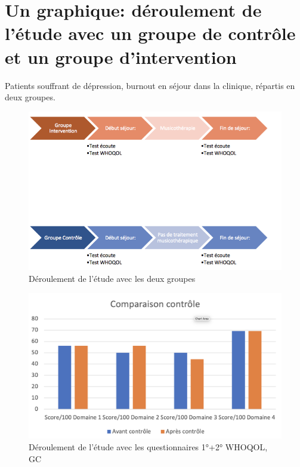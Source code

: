  	
 	\section{Un graphique: déroulement de l'étude avec un groupe
          de contrôle et un groupe d'intervention}





                                      Patients souffrant de dépression, burnout
                                               en séjour dans la
                                               clinique, répartis en
                                               deux groupes.
                                             

\begin{figure}
\centering
\includegraphics[width=0.7\linewidth]{images/Groupecontrole.png}
\caption[Schéma du déroulement]{Déroulement de l'étude avec les
         deux groupes}
       
\label{groupecontroleimage1}
\end{figure}

\begin{figure}
\centering
\includegraphics[width=0.7\linewidth]{images/Compcontrole.png}
\caption[Schéma du déroulement]{Déroulement de l'étude avec les
         questionnaires 1°+2° WHOQOL, GC}
       
\label{groupecontroleimage1}
\end{figure}

